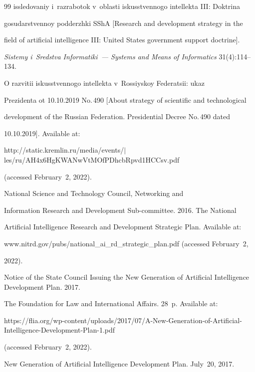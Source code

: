 {{\begin{thebibliography}{99}
issledovaniy i~raz\-ra\-bo\-tok v~oblasti iskusstvennogo intellekta III: Doktrina 


gosudarstvennoy pod\-derzh\-ki SShA [Research and development strategy in the 


field of artificial intelligence III: United States government support doctrine].


 \textit{Sistemy i~Sredstva Informatiki~--- Systems and Means of Informatics} 31(4):114--134.




O razvitii iskusstvennogo intellekta v~Rossiyskoy Federatsii: ukaz 


Prezidenta ot 10.10.2019 No.\,490 [About strategy of scientific and technological 


development of the Russian Federation. Presidential Decree No.\,490 dated 


10.10.2019]. Available at: 


{\sf http://static.kremlin.ru/media/events/$\vert$les/ru/AH4x6HgKWANwVtMOfPDhcbRpvd\linebreak 1HCCsv.pdf}


 (accessed February~2, 2022).




     National Science and Technology Council, Networking and 


Information Research and Development Sub-committee. 2016. The National 


Artificial Intelligence Research and Development Strategic Plan. Available at: 


{\sf www.nitrd.gov/pubs/\linebreak national\_ai\_rd\_strategic\_plan.pdf} (accessed February~2, 


2022).




 Notice of the State Council Issuing the New Generation of Artificial Intelligence Development Plan. 2017. 


The Foundation for Law and International Affairs. 28~p. Available at: 


{\sf https://flia.org/wp-content/uploads/2017/07/A-New-Generation-\linebreak of-Artificial-Intelligence-Development-Plan-1.pdf}


 (accessed February~2, 2022).




     New Generation of Artificial Intelligence Development Plan. July~20, 2017.



\end{thebibliography}}}
